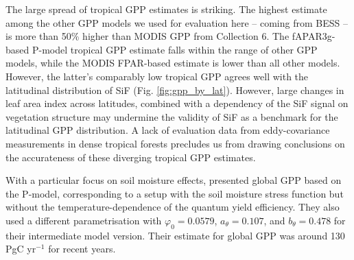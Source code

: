 \documentclass[gmd, manuscript]{copernicus}
\begin{document}
The large spread of tropical GPP estimates is striking. The highest estimate among the other GPP models we used for evaluation here -- coming from BESS -- is more than 50\% higher than MODIS GPP from Collection 6. The fAPAR3g-based P-model tropical GPP estimate falls within the range of other GPP models, while the MODIS FPAR-based estimate is lower than all other models. However, the latter's comparably low tropical GPP agrees well with the latitudinal distribution of SiF (Fig. \ref{fig:gpp_by_lat}). However, large changes in leaf area index across latitudes, combined with a dependency of the SiF signal on vegetation structure \citep{zeng19rse} may undermine the validity of SiF as a benchmark for the latitudinal GPP distribution. A lack of evaluation data from eddy-covariance measurements in dense tropical forests precludes us from drawing conclusions on the accurateness of these diverging tropical GPP estimates. 

With a particular focus on soil moisture effects, \citet{stocker19natgeo} presented global GPP based on the P-model, corresponding to a setup with the soil moisture stress function but without the temperature-dependence of the quantum yield efficiency. They also used a different parametrisation with $\varphi_0 = 0.0579$, $a_\theta = 0.107$, and $b_\theta = 0.478$ for their intermediate model version. Their estimate for global GPP was around 130 PgC yr$^{-1}$ for recent years.
\end{document}
